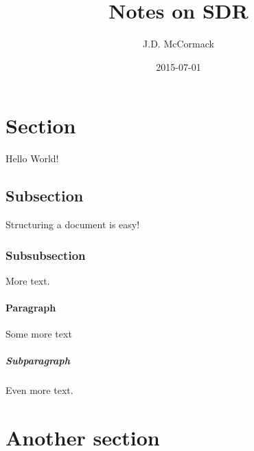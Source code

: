 \documentclass{article}
\title{Notes on SDR}
\date{2015-07-01}
\author{J.D. McCormack}
\begin{document}
\maketitle
{}
\newpage
{}

\section{Section}

Hello World!

\subsection{Subsection}

Structuring a document is easy!
\subsubsection{Subsubsection}

More text.

\paragraph{Paragraph}

Some more text

\subparagraph{Subparagraph}

Even more text.

\section{Another section}
\end{document}
